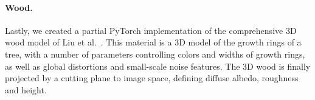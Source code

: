 \paragraph*{Wood.} Lastly, we created a partial PyTorch implementation of the comprehensive 3D wood model of Liu et al.~\cite{Liu2016}. This material is a 3D model of the growth rings of a tree, with a number of parameters controlling colors and widths of growth rings, as well as global distortions and small-scale noise features. The 3D wood is finally projected by a cutting plane to image space, defining diffuse albedo, roughness and height.
